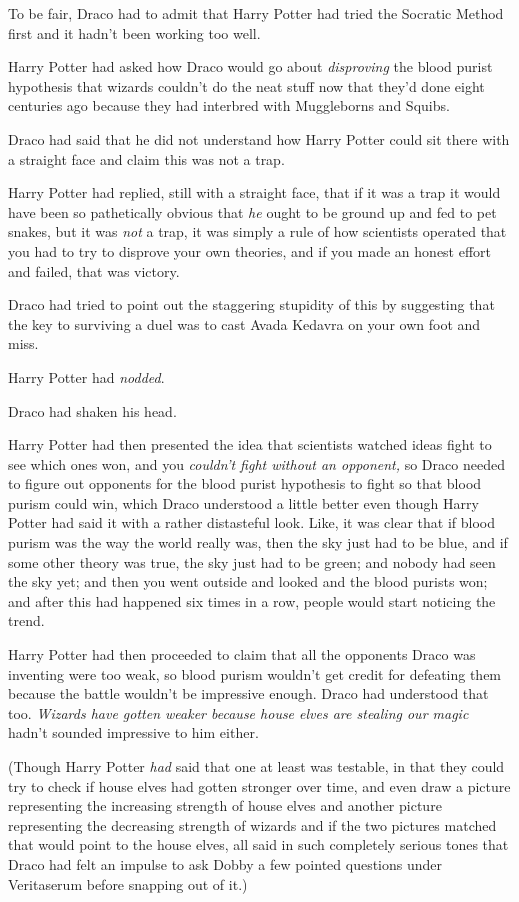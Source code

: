 To be fair, Draco had to admit that Harry Potter had tried the Socratic
Method first and it hadn't been working too well.

Harry Potter had asked how Draco would go about \emph{disproving} the
blood purist hypothesis that wizards couldn't do the neat stuff now that
they'd done eight centuries ago because they had interbred with
Muggleborns and Squibs.

Draco had said that he did not understand how Harry Potter could sit
there with a straight face and claim this was not a trap.

Harry Potter had replied, still with a straight face, that if it was a
trap it would have been so pathetically obvious that \emph{he} ought to
be ground up and fed to pet snakes, but it was \emph{not} a trap, it was
simply a rule of how scientists operated that you had to try to disprove
your own theories, and if you made an honest effort and failed, that was
victory.

Draco had tried to point out the staggering stupidity of this by
suggesting that the key to surviving a duel was to cast Avada Kedavra on
your own foot and miss.

Harry Potter had \emph{nodded}.

Draco had shaken his head.

Harry Potter had then presented the idea that scientists watched ideas
fight to see which ones won, and you \emph{couldn't fight without an
opponent,} so Draco needed to figure out opponents for the blood purist
hypothesis to fight so that blood purism could win, which Draco
understood a little better even though Harry Potter had said it with a
rather distasteful look. Like, it was clear that if blood purism was the
way the world really was, then the sky just had to be blue, and if some
other theory was true, the sky just had to be green; and nobody had seen
the sky yet; and then you went outside and looked and the blood purists
won; and after this had happened six times in a row, people would start
noticing the trend.

Harry Potter had then proceeded to claim that all the opponents Draco
was inventing were too weak, so blood purism wouldn't get credit for
defeating them because the battle wouldn't be impressive enough. Draco
had understood that too. \emph{Wizards have gotten weaker because house
elves are stealing our magic} hadn't sounded impressive to him either.

(Though Harry Potter \emph{had} said that one at least was testable, in
that they could try to check if house elves had gotten stronger over
time, and even draw a picture representing the increasing strength of
house elves and another picture representing the decreasing strength of
wizards and if the two pictures matched that would point to the house
elves, all said in such completely serious tones that Draco had felt an
impulse to ask Dobby a few pointed questions under Veritaserum before
snapping out of it.)

